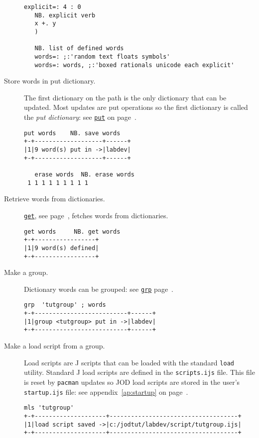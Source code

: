 \begin{description}
\begin{lstlisting}[frame=single,framerule=0pt]
   explicit=: 4 : 0
   NB. explicit verb
   x +. y
   )
   
   NB. list of defined words
   words=: ;:'random text floats symbols'
   words=: words, ;:'boxed rationals unicode each explicit'
\end{lstlisting}

\item[Store words in put dictionary.] The first dictionary on the path is the
only dictionary that can be updated.  Most updates are put
operations so the first dictionary is called the \emph{put dictionary}\label{xr:putdic}: see
\hyperlink{il:put}{\texttt{put}} on page~\pageref{ss:put}.
\begin{lstlisting}[frame=single,framerule=0pt]
   put words    NB. save words
+-+-------------------+------+
|1|9 word(s) put in ->|labdev|
+-+-------------------+------+

   erase words  NB. erase words
 1 1 1 1 1 1 1 1 1
\end{lstlisting}

\item[Retrieve words from dictionaries.] \hyperlink{il:get}{\texttt{get}}, see 
page~\pageref{ss:get}, fetches words from dictionaries.  
\begin{lstlisting}[frame=single,framerule=0pt]
   get words     NB. get words
+-+-----------------+
|1|9 word(s) defined|
+-+-----------------+
\end{lstlisting}

\item[Make a group.] Dictionary words can be grouped: see \hyperlink{il:grp}{\texttt{grp}} 
page~\pageref{ss:grp}.  
\begin{lstlisting}[frame=single,framerule=0pt]
   grp  'tutgroup' ; words
+-+--------------------------+------+
|1|group <tutgroup> put in ->|labdev|
+-+--------------------------+------+
\end{lstlisting}

\item[Make a load script from a group.] Load scripts are J scripts that can be loaded
with the standard \texttt{load} utility.  Standard J load scripts are defined in the \verb|scripts.ijs| file.  This file is reset by \texttt{pacman} updates
so JOD load scripts are stored in the user's \verb|startup.ijs| file: 
see appendix~\ref{ap:startup} on page~\pageref{ap:startup}.
\begin{lstlisting}[frame=single,framerule=0pt]
   mls 'tutgroup'
+-+--------------------+------------------------------------+
|1|load script saved ->|c:/jodtut/labdev/script/tutgroup.ijs|
+-+--------------------+------------------------------------+


\end{lstlisting}
\end{description}
